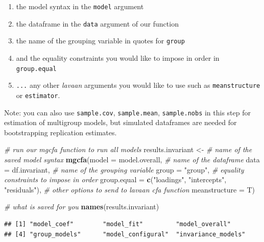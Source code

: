 \documentclass[
  man]{apa7}
\newenvironment{Shaded}{\begin{snugshade}}{\end{snugshade}}
\newcommand{\AttributeTok}[1]{\textcolor[rgb]{0.13,0.29,0.53}{#1}}
\newcommand{\CommentTok}[1]{\textcolor[rgb]{0.56,0.35,0.01}{\textit{#1}}}
\newcommand{\FunctionTok}[1]{\textcolor[rgb]{0.13,0.29,0.53}{\textbf{#1}}}
\newcommand{\NormalTok}[1]{#1}
\newcommand{\OtherTok}[1]{\textcolor[rgb]{0.56,0.35,0.01}{#1}}
\newcommand{\StringTok}[1]{\textcolor[rgb]{0.31,0.60,0.02}{#1}}
\providecommand{\tightlist}{%
  \setlength{\itemsep}{0pt}\setlength{\parskip}{0pt}}
\begin{document}
\begin{enumerate}
\def\labelenumi{\arabic{enumi})}
\tightlist
\item
  the model syntax in the \texttt{model} argument
\item
  the dataframe in the \texttt{data} argument of our function
\item
  the name of the grouping variable in quotes for \texttt{group}
\item
  and the equality constraints you would like to impose in order in \texttt{group.equal}
\item
  \texttt{...} any other \emph{lavaan} arguments you would like to use such as \texttt{meanstructure} or \texttt{estimator}.
\end{enumerate}

Note: you can also use \texttt{sample.cov}, \texttt{sample.mean}, \texttt{sample.nobs} in this step for estimation of multigroup models, but simulated dataframes are needed for bootstrapping replication estimates.

\small

\begin{Shaded}
\begin{Highlighting}[]
\CommentTok{\# run our mgcfa function to run all models}
\NormalTok{results.invariant }\OtherTok{\textless{}{-}} 
  \CommentTok{\# name of the saved model syntax}
  \FunctionTok{mgcfa}\NormalTok{(}\AttributeTok{model =}\NormalTok{ model.overall, }
        \CommentTok{\# name of the dataframe}
        \AttributeTok{data =}\NormalTok{ df.invariant,}
        \CommentTok{\# name of the grouping variable}
        \AttributeTok{group =} \StringTok{"group"}\NormalTok{,}
        \CommentTok{\# equality constraints to impose in order}
        \AttributeTok{group.equal =} \FunctionTok{c}\NormalTok{(}\StringTok{"loadings"}\NormalTok{, }\StringTok{"intercepts"}\NormalTok{, }\StringTok{"residuals"}\NormalTok{),}
        \CommentTok{\# other options to send to lavaan cfa function}
        \AttributeTok{meanstructure =}\NormalTok{ T)}

\CommentTok{\# what is saved for you}
\FunctionTok{names}\NormalTok{(results.invariant)}
\end{Highlighting}
\end{Shaded}

\normalsize

\begin{verbatim}
## [1] "model_coef"        "model_fit"         "model_overall"    
## [4] "group_models"      "model_configural"  "invariance_models"
\end{verbatim}
\end{document}
